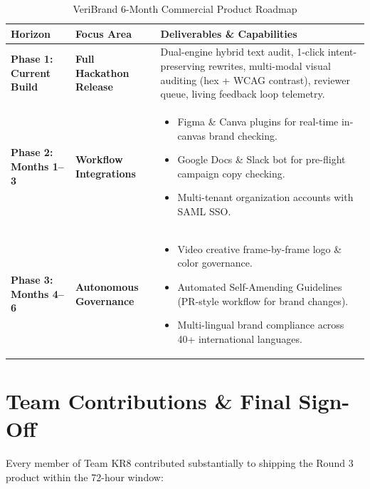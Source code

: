 \documentclass[11pt,a4paper]{article}
\begin{document}
\begin{table}[H]
\centering
\small
\begin{tabular}{@{}p{3.2cm}p{5.5cm}p{5.5cm}@{}}
\toprule
\textbf{Horizon} & \textbf{Focus Area} & \textbf{Deliverables \& Capabilities} \\
\midrule
\textbf{Phase 1: Current Build} & \textbf{Full Hackathon Release} & Dual-engine hybrid text audit, 1-click intent-preserving rewrites, multi-modal visual auditing (hex + WCAG contrast), reviewer queue, living feedback loop telemetry. \\
\midrule
\textbf{Phase 2: Months 1--3} & \textbf{Workflow Integrations} & 
\begin{itemize}[leftmargin=0.4cm]
    \item Figma \& Canva plugins for real-time in-canvas brand checking.
    \item Google Docs \& Slack bot for pre-flight campaign copy checking.
    \item Multi-tenant organization accounts with SAML SSO.
\end{itemize} \\
\midrule
\textbf{Phase 3: Months 4--6} & \textbf{Autonomous Governance} & 
\begin{itemize}[leftmargin=0.4cm]
    \item Video creative frame-by-frame logo \& color governance.
    \item Automated Self-Amending Guidelines (PR-style workflow for brand changes).
    \item Multi-lingual brand compliance across 40+ international languages.
\end{itemize} \\
\bottomrule
\end{tabular}
\caption{VeriBrand 6-Month Commercial Product Roadmap}
\end{table}

\newpage

\section{Team Contributions \& Final Sign-Off}

Every member of Team KR8 contributed substantially to shipping the Round 3 product within the 72-hour window:
\end{document}
